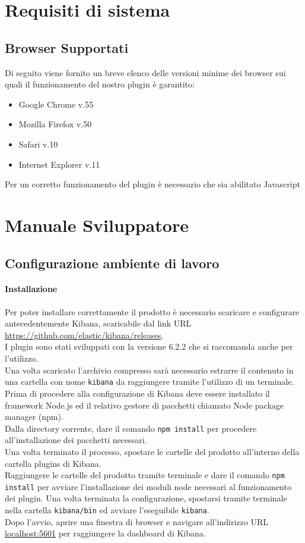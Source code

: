 \section{Requisiti di sistema}
\subsection{Browser Supportati}

Di seguito viene fornito un breve elenco delle versioni minime dei browser sui quali il funzionamento del nostro plugin è garantito:
\begin{itemize}
	
	\item Google Chrome v.55
	\item Mozilla Firefox v.50
	\item Safari v.10
	\item Internet Explorer v.11
	
\end{itemize}

Per un corretto funzionamento del plugin è necessario che sia abilitato Javascript




\section{Manuale Sviluppatore}
\subsection{Configurazione ambiente di lavoro}
\paragraph{Installazione}
Per poter installare correttamente il prodotto è necessario scaricare e configurare antecedentemente Kibana, scaricabile dal link URL \url{https://github.com/elastic/kibana/releases}.\\
I plugin sono stati sviluppati con la versione 6.2.2 che si raccomanda anche per l'utilizzo.\\
Una volta scaricato l'archivio compresso sarà necessario estrarre il contenuto in una cartella con nome \texttt{kibana} da raggiungere tramite l'utilizzo di un terminale.
Prima di procedere alla configurazione di Kibana deve essere installato il framework Node.js ed il relativo gestore di pacchetti chiamato Node package manager (npm).\\
Dalla directory corrente, dare il comando \texttt{npm install} per procedere all'installazione dei pacchetti necessari.\\
Una volta terminato il processo, spostare le cartelle del prodotto all'interno della cartella plugins di Kibana.\\
Raggiungere le cartelle del prodotto tramite terminale e dare il comando \texttt{npm install} per avviare l'installazione dei moduli node necessari al funzionamento dei plugin.
Una volta terminata la configurazione, spostarsi tramite terminale nella cartella \texttt{kibana/bin} ed avviare l'eseguibile \texttt{kibana}.\\
Dopo l'avvio, aprire una finestra di browser e navigare all'indirizzo URL \url{localhost:5601} per raggiungere la dashboard di Kibana.
